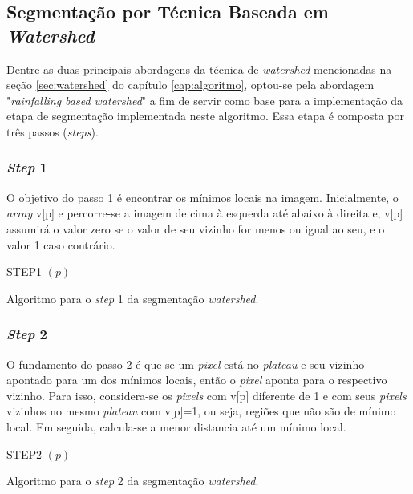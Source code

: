 \subsection{Segmentação por Técnica Baseada em \textit{Watershed}}
Dentre as duas principais abordagens da técnica de \textit{watershed} mencionadas na seção \ref{sec:watershed} do capítulo \ref{cap:algoritmo}, optou-se pela abordagem "\textit{rainfalling based watershed}" a fim de servir como base para a implementação da etapa de segmentação implementada neste algoritmo. Essa etapa é composta por três passos (\textit{steps}). 

\subsubsection{\textit{Step} 1}
O objetivo do passo 1 é encontrar os mínimos locais na imagem. Inicialmente, o \textit{array} v[p] e percorre-se a imagem de cima à esquerda até abaixo à direita e, v[p] assumirá o valor zero se o valor de seu vizinho for menos ou igual ao seu, e o valor 1 caso contrário.


\begin{algorithm}[H]
\SetAlgoLined


    \underline{STEP1} $(p)$\;
 
\caption{Algoritmo para o \textit{step} 1 da segmentação \textit{watershed}. \cite{ruparelia2012implementation}}
\end{algorithm}

\subsubsection{\textit{Step} 2} 
O fundamento do passo 2 é que se um \textit{pixel} está no \textit{plateau} e seu vizinho apontado para um dos mínimos locais, então o \textit{pixel} aponta para o respectivo vizinho. Para isso, considera-se os \textit{pixels} com v[p] diferente de 1 e com seus \textit{pixels} vizinhos no mesmo \textit{plateau} com v[p]=1, ou seja, regiões que não são de mínimo local. Em seguida, calcula-se a menor distancia até um mínimo local.

\begin{algorithm}[H]
\SetAlgoLined


    \underline{STEP2} $(p)$\;
		
 
\caption{Algoritmo para o \textit{step} 2 da segmentação \textit{watershed}. \cite{ruparelia2012implementation}}
\end{algorithm}


